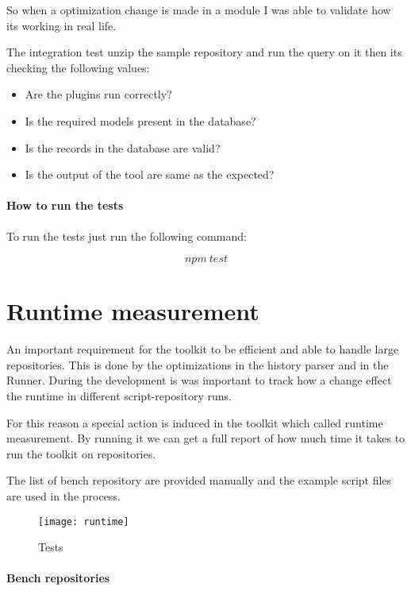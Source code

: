 So when a optimization change is made in a module I was able to validate how its working in real life.

The integration test unzip the sample repository and run the query on it then its checking the following values:

\begin{itemize}
	\item Are the plugins run correctly?
	\item Is the required models present in the database?
	\item Is the records in the database are valid?
	\item Is the output of the tool are same as the expected?
\end{itemize}

\subsubsection{How to run the tests}

To run the tests just run the following command:

\[ npm\ test \]


\chapter{Runtime measurement}
\label{appx:simulation}

An important requirement for the toolkit to be efficient and able to handle large repositories. This is done by the optimizations in the history parser and in the Runner. During the development is was important to track how a change effect the runtime in different script-repository runs.   

For this reason a special action is induced in the toolkit which called runtime measurement. By running it we can get a full report of how much time it takes to run the toolkit on repositories.

The list of bench repository are provided manually and the example script files are used in the process.

\begin{figure}[H]
	\centering
	\texttt{[image: runtime]}
	\caption{Tests}
	\label{fig:fig-runtime}
\end{figure}

\subsubsection{Bench repositories}

